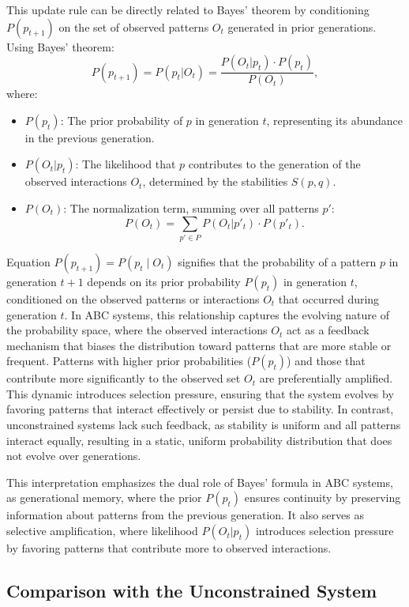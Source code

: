 \documentclass[%
 preprint, linenumbers,
 amsmath,amssymb,
 aps, physrev,
]{revtex4-2}
\begin{document}
This update rule can be directly related to Bayes' theorem by conditioning \( P(p_{t+1}) \) on the set of observed patterns \( O_t \) generated in prior generations. Using Bayes' theorem:
\[
P(p_{t+1}) = P(p_t | O_t) = \frac{P(O_t | p_t) \cdot P(p_t)}{P(O_t)},
\]
where:
\begin{itemize}
    \item \( P(p_t) \): The prior probability of \( p \) in generation \( t \), representing its abundance in the previous generation.
    \item \( P(O_t | p_t) \): The likelihood that \( p \) contributes to the generation of the observed interactions \( O_t \), determined by the stabilities \( S(p, q) \).
    \item \( P(O_t) \): The normalization term, summing over all patterns \( p' \):
    \[
    P(O_t) = \sum_{p' \in P} P(O_t | p'_t) \cdot P(p'_t).
    \]
\end{itemize}

Equation \( P(p_{t+1}) = P(p_t \mid O_t) \) signifies that the probability of a pattern \( p \) in generation \( t+1 \) depends on its prior probability \( P(p_t) \) in generation \( t \), conditioned on the observed patterns or interactions \( O_t \) that occurred during generation \( t \). In ABC systems, this relationship captures the evolving nature of the probability space, where the observed interactions \( O_t \) act as a feedback mechanism that biases the distribution toward patterns that are more stable or frequent. Patterns with higher prior probabilities (\( P(p_t) \)) and those that contribute more significantly to the observed set \( O_t \) are preferentially amplified. This dynamic introduces selection pressure, ensuring that the system evolves by favoring patterns that interact effectively or persist due to stability. In contrast, unconstrained systems lack such feedback, as stability is uniform and all patterns interact equally, resulting in a static, uniform probability distribution that does not evolve over generations.


This interpretation emphasizes the dual role of Bayes' formula in ABC systems, as generational memory, where the prior \( P(p_t) \) ensures continuity by preserving information about patterns from the previous generation.
It also serves as selective amplification, where likelihood \( P(O_t | p_t) \) introduces selection pressure by favoring patterns that contribute more to observed interactions.

\subsection{Comparison with the Unconstrained System}
\end{document}
